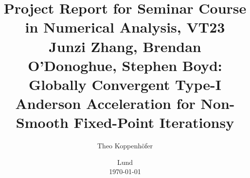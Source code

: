 




\title{ Project Report for Seminar Course in Numerical Analysis, VT23 \\[1ex]
	  \large Junzi Zhang, Brendan O'Donoghue, Stephen Boyd: Globally Convergent Type-I Anderson Acceleration for Non-Smooth Fixed-Point Iterationsy}
\author{Theo Koppenhöfer}
\date{Lund \\[1ex] \today}







\maketitle


